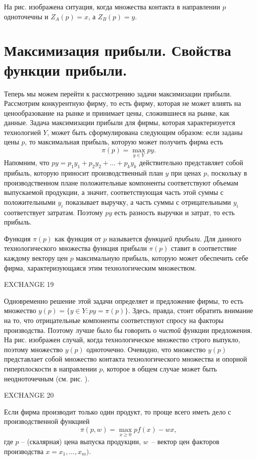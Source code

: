 На рис.       изображена ситуация, когда множества контакта в направлении $p$ одноточечны
и $Z_A(p)=x$, а $Z_B(p)=y$.

\section*{Максимизация прибыли. Свойства функции прибыли.}

Теперь мы можем перейти к рассмотрению задачи максимизации прибыли.
Рассмотрим конкурентную фирму, то есть
фирму, которая не может влиять на ценообразование на рынке и принимает
цены, сложившиеся на рынке, как данные. Задача максимизации прибыли
для фирмы, которая характеризуется технологией $Y$,
может быть сформулирована следующим образом: если заданы цены $p$, то
максимальная прибыль, которую может получить фирма есть
$$
\pi (p)=\max_{y\in Y} py.
$$
Напомним, что $py=p_1y_1+p_2y_2+\ldots+p_ky_k$ действительно представляет собой
прибыль, которую приносит производственный план $y$ при ценах
$p$, поскольку в производственном плане положительные компоненты соответствуют
объемам выпускаемой продукции, а значит, соответствующая часть этой суммы
с положительными $y_i$ показывает выручку, а часть суммы с отрицательными
$y_i$  соответствует затратам. Поэтому $py$ есть разность выручки и затрат,
то есть прибыль.

Функция $\pi (p)$ как функция от $p$ называется \emph{функцией прибыли}.
Для данного технологического множества функция прибыли $\pi (p)$ ставит
в соответствие каждому вектору цен $p$ максимальную прибыль, которую
может обеспечить себе фирма, характеризующаяся этим технологическим множеством.

EXCHANGE 19

Одновременно решение этой задачи определяет и предложение фирмы, то есть
множество $y(p)= \{y\in Y: py=\pi(p)\}$. Здесь, правда, стоит обратить внимание на то,
что отрицательные компоненты соответствуют спросу на факторы производства. Поэтому
лучше было бы говорить о \emph{чистой} функции предложения.
На рис. изображен случай, когда технологическое множество строго выпукло,
поэтому множество $y(p)$ одноточечно. Очевидно, что множество $y(p)$
представлает собой множество контакта технологического множества и
опорной гиперплоскости в направлении $p$, которое в общем случае
может быть неодноточечным (см. рис.    ).

EXCHANGE 20

Если фирма производит только один продукт, то проще всего иметь дело с
производственной функцией
$$
\pi (p,w)=\max_{x\ge 0}pf(x)-wx,
$$
где $p$ -- (скалярная) цена выпуска продукции, $w$~-- вектор цен
факторов производства  $x=x_1,\ldots,x_m)$.


